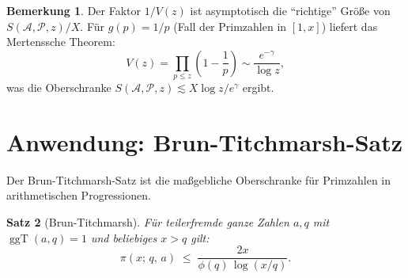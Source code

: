 \documentclass[12pt,a4paper]{amsart}
\newtheorem{theorem}{Satz}[section]
\theoremstyle{definition}
\newtheorem{bemerkung}[theorem]{Bemerkung}
\DeclareMathOperator{\ggT}{ggT}
\begin{document}
\begin{bemerkung}
  Der Faktor $1/V(z)$ ist asymptotisch die ``richtige'' Größe von
  $S(\mathcal{A},\mathcal{P},z)/X$.  Für $g(p) = 1/p$ (Fall der Primzahlen
  in $[1,x]$) liefert das Mertenssche Theorem:
  \[
    V(z) = \prod_{p \leq z} \left(1 - \frac{1}{p}\right) \sim \frac{e^{-\gamma}}{\log z},
  \]
  was die Oberschranke $S(\mathcal{A},\mathcal{P},z) \lesssim X \log z / e^{\gamma}$ ergibt.
\end{bemerkung}

\section{Anwendung: Brun-Titchmarsh-Satz}
\label{sec:brun_titchmarsh}

Der Brun-Titchmarsh-Satz ist die maßgebliche Oberschranke für Primzahlen
in arithmetischen Progressionen.

\begin{theorem}[Brun-Titchmarsh]\label{thm:brun_titchmarsh}
  Für teilerfremde ganze Zahlen $a, q$ mit $\ggT(a,q) = 1$ und beliebiges $x > q$ gilt:
  \[
    \pi(x;\,q,\,a)
    \;\leq\; \frac{2x}{\phi(q)\,\log(x/q)}.
  \]
\end{theorem}
\end{document}
